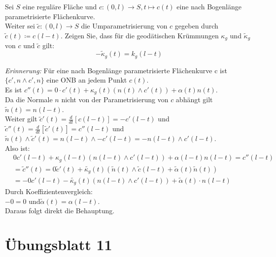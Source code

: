 \begin{assignment}
Sei $ S $ eine reguläre Fläche und $ c: (0,l) \to S, t \mapsto c(t) $ eine nach Bogenlänge parametrisierte Flächenkurve.\\
Weiter sei $\tilde{ c } : (0,l) \to S$ die Umparametrisierung von $ c $ gegeben durch $\tilde{ c }(t) \coloneqq c(l-t)$. Zeigen Sie, dass für die geodätischen Krümmungen $\kappa_g$ und $\tilde{ \kappa }_g$ von $ c $ und $\tilde{ c }$ gilt: 
\begin{equation*}
  -\tilde{\kappa}_g(t) = k_g(l-t) 
\end{equation*}
\end{assignment}
\begin{solution}
  \emph{Erinnerung:} Für eine nach Bogenlänge parametrisierte Flächenkurve c ist \( \{ c', n \land c', n \} \) eine ONB an jedem Punkt \( c(t) \). \\
  Es ist \( c''(t) = 0 \cdot c'(t) + \kappa_g(t)(n(t) \land c'(t)) + \alpha(t) n(t) \). \\
  Da die Normale \( n \) nicht von der Parametrisierung von \( c \) abhängt gilt \( \tilde{n}(t) = n(l-t) \). \\
  Weiter gilt \( \tilde{c}'(t) = \frac{d}{dt}[c(l-t)] = - c'(l-t) \) und \\
  \( \tilde{c}''(t) = \frac{d}{dt}[\tilde{c}'(t)] = c''(l-t) \) und \\
  \( \tilde{n}(t) \land \tilde{c}'(t) = n(l-t) \land - c'(l-t) = -n (l-t) \land c'(l-t) \). \\
  Also ist:
  \begin{align*}
    & 0c'(l-t) + \kappa_g(l-t)(n(l-t) \land c'(l-t)) + \alpha(l-t)n(l-t) = c''(l-t) \\
    &= \tilde{c}''(t) = 0\tilde{c}'(t) + \tilde{\kappa_g}(t)(\tilde{n}(t) \land \tilde{c}(l-t) + \tilde{\alpha}(t) \tilde{n}(t)) \\
    &= -0 c'(l-t) - \tilde{\kappa_g}(t)(n(l-t) \land c'(l-t)) + \tilde{\alpha}(t) \cdot n(l-t)
  \end{align*}
  Durch Koeffizientenvergleich: \\
  \( -0 = 0 \text{ und} \tilde{\alpha}(t) = \alpha(l-t) \). \\
  Daraus folgt direkt die Behauptung.
\end{solution}

%
\section{Übungsblatt 11}


